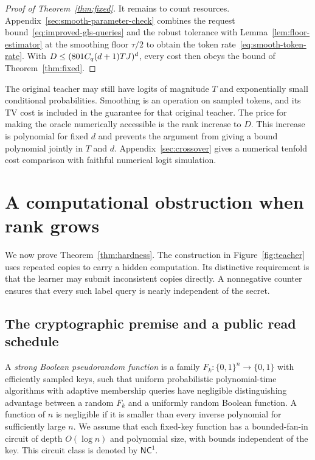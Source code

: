 \documentclass[11pt]{article}
\theoremstyle{definition}
\theoremstyle{remark}
\begin{document}
\begin{proof}[Proof of Theorem~\ref{thm:fixed}]
It remains to count resources. Appendix~\ref{sec:smooth-parameter-check} combines the request bound~\eqref{eq:improved-gls-queries} and the robust tolerance with Lemma~\ref{lem:floor-estimator} at the smoothing floor $\tau/2$ to obtain the token rate~\eqref{eq:smooth-token-rate}. With $D\le\nobreak(801C_q(d+1)TJ)^d$, every cost then obeys the bound of Theorem~\ref{thm:fixed}.
\end{proof}

The original teacher may still have logits of magnitude $T$ and exponentially small conditional probabilities. Smoothing is an operation on sampled tokens, and its TV cost is included in the guarantee for that original teacher. The price for making the oracle numerically accessible is the rank increase to $D$. This increase is polynomial for fixed $d$ and prevents the argument from giving a bound polynomial jointly in $T$ and $d$.
Appendix~\ref{sec:crossover} gives a numerical tenfold cost comparison with faithful numerical logit simulation.


\section{A computational obstruction when rank grows}\label{sec:hardness}

We now prove Theorem~\ref{thm:hardness}. The construction in Figure~\ref{fig:teacher} uses repeated copies to carry a hidden computation. Its distinctive requirement is that the learner may submit inconsistent copies directly. A nonnegative counter ensures that every such label query is nearly independent of the secret.

\subsection{The cryptographic premise and a public read schedule}

A \emph{strong Boolean pseudorandom function} is a family $F_k:\{0,1\}^n\to\{0,1\}$ with efficiently sampled keys, such that uniform probabilistic polynomial-time algorithms with adaptive membership queries have negligible distinguishing advantage between a random $F_k$ and a uniformly random Boolean function. A function of $n$ is negligible if it is smaller than every inverse polynomial for sufficiently large $n$. We assume that each fixed-key function has a bounded-fan-in circuit of depth $O(\log n)$ and polynomial size, with bounds independent of the key. This circuit class is denoted by $\mathsf{NC}^1$.
\end{document}
